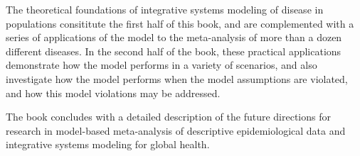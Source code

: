 The theoretical foundations of integrative systems modeling of disease
in populations consititute the first half of this book, and are
complemented with a series of applications of the model to the
meta-analysis of more than a dozen different diseases.  In the second
half of the book, these practical applications 
demonstrate how the model performs in a variety of scenarios,
and also investigate how the model performs when the model assumptions
are violated, and how this model violations may be addressed.

The book concludes with a detailed description of the future
directions for research in model-based meta-analysis of descriptive
epidemiological data and integrative systems modeling for global
health.
